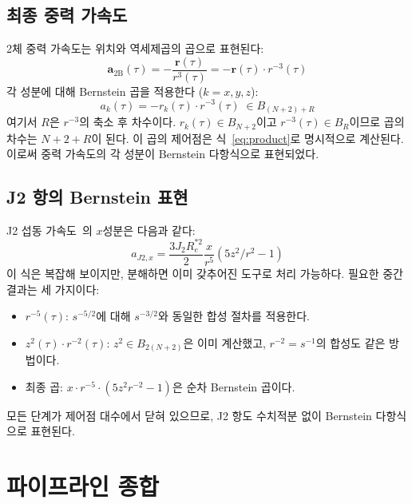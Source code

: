 \documentclass[11pt]{article}
\begin{document}
\subsection{최종 중력 가속도}

2체 중력 가속도는 위치와 역세제곱의 곱으로 표현된다:
\begin{equation}
  \mathbf{a}_\mathrm{2B}(\tau) = -\frac{\mathbf{r}(\tau)}{r^3(\tau)}
  = -\mathbf{r}(\tau) \cdot r^{-3}(\tau)
  \label{eq:a-2body}
\end{equation}
각 성분에 대해 Bernstein 곱을 적용한다 ($k = x, y, z$):
\begin{equation}
  a_k(\tau) = -r_k(\tau) \cdot r^{-3}(\tau)
  \;\in B_{(N+2) + R}
  \label{eq:ak-product}
\end{equation}
여기서 $R$은 $r^{-3}$의 축소 후 차수이다.
$r_k(\tau) \in B_{N+2}$이고 $r^{-3}(\tau) \in B_R$이므로
곱의 차수는 $N+2+R$이 된다.
이 곱의 제어점은 식~\eqref{eq:product}로 명시적으로 계산된다.
이로써 중력 가속도의 각 성분이 Bernstein 다항식으로 표현되었다.

\subsection{J2 항의 Bernstein 표현}

J2 섭동 가속도~\cite{report002}의 $x$성분은 다음과 같다:
\begin{equation}
  a_{J2,x} = \frac{3 J_2 R_e^{*2}}{2} \frac{x}{r^5}(5z^2/r^2 - 1)
  \label{eq:j2-x}
\end{equation}
이 식은 복잡해 보이지만, 분해하면 이미 갖추어진 도구로 처리 가능하다.
필요한 중간 결과는 세 가지이다:
\begin{itemize}
  \item $r^{-5}(\tau)$: $s^{-5/2}$에 대해 $s^{-3/2}$와 동일한 합성 절차를 적용한다.
  \item $z^2(\tau) \cdot r^{-2}(\tau)$: $z^2 \in B_{2(N+2)}$은 이미 계산했고,
        $r^{-2} = s^{-1}$의 합성도 같은 방법이다.
  \item 최종 곱: $x \cdot r^{-5} \cdot (5 z^2 r^{-2} - 1)$은 순차 Bernstein 곱이다.
\end{itemize}
모든 단계가 제어점 대수에서 닫혀 있으므로,
J2 항도 수치적분 없이 Bernstein 다항식으로 표현된다.

\section{파이프라인 종합}
\label{sec:pipeline}
\end{document}
